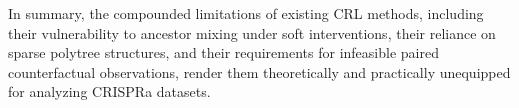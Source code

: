 In summary, the compounded limitations of existing CRL methods, including their vulnerability to ancestor mixing under soft interventions, their reliance on sparse polytree structures, and their requirements for infeasible paired counterfactual observations, render them theoretically and practically unequipped for analyzing CRISPRa datasets.

%
%
%
%
